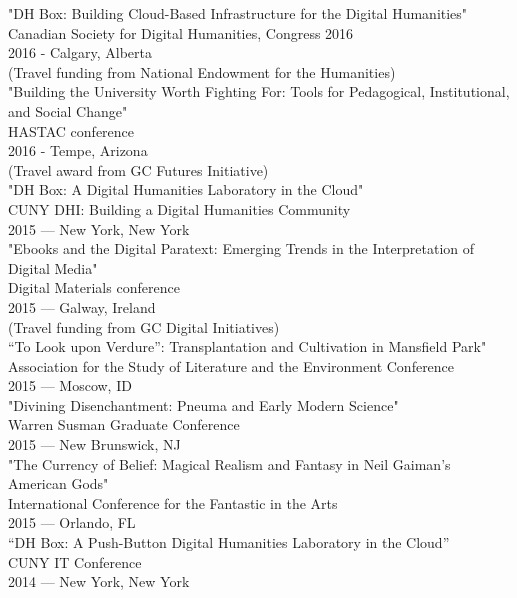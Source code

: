 \documentclass[11pt]{article}
\begin{document}
"DH Box: Building Cloud-Based Infrastructure for the Digital Humanities"\\
Canadian Society for Digital Humanities, Congress 2016\\
2016 - Calgary, Alberta\\
(Travel funding from National Endowment for the Humanities)\\

"Building the University Worth Fighting For: Tools for Pedagogical, Institutional, and Social Change"\\
HASTAC conference\\
2016 - Tempe, Arizona\\
(Travel award from GC Futures Initiative)\\

"DH Box: A Digital Humanities Laboratory in the Cloud"\\
CUNY DHI: Building a Digital Humanities Community\\
2015 — New York, New York\\

"Ebooks and the Digital Paratext: Emerging Trends in the Interpretation of Digital Media"\\
Digital Materials conference\\
2015 — Galway, Ireland\\
(Travel funding from GC Digital Initiatives)\\

“To Look upon Verdure”: Transplantation and Cultivation in Mansfield Park"\\
Association for the Study of Literature and the Environment Conference\\
2015 — Moscow, ID\\

"Divining Disenchantment: Pneuma and Early Modern Science"\\
Warren Susman Graduate Conference\\
2015 — New Brunswick, NJ\\

"The Currency of Belief: Magical Realism and Fantasy in Neil Gaiman’s American Gods"\\
International Conference for the Fantastic in the Arts\\
2015 — Orlando, FL\\

“DH Box: A Push-Button Digital Humanities Laboratory in the Cloud”\\
CUNY IT Conference\\
2014 — New York, New York\\
\end{document}

